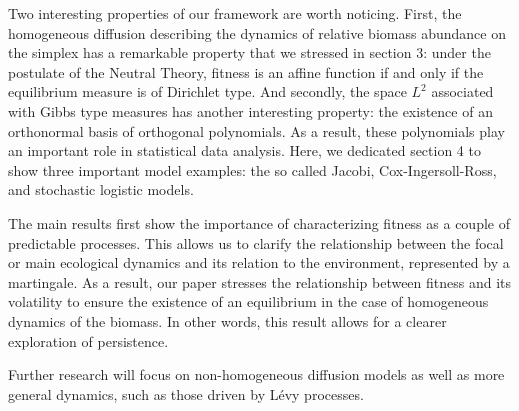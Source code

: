 \documentclass[12pt]{article}
\begin{document}
Two interesting properties of our framework are worth noticing. First, the homogeneous diffusion describing the dynamics of relative biomass abundance on the simplex has a remarkable property that we stressed in section 3: under the postulate of the Neutral Theory, fitness is an affine function if and only if the equilibrium measure is of Dirichlet type. And secondly, the space $L^2$ associated with Gibbs type measures has another interesting property: the existence of an orthonormal basis of orthogonal polynomials. As a result, these polynomials play an important role in statistical data analysis. Here, we dedicated section 4 to show three important model examples: the so called Jacobi, Cox-Ingersoll-Ross, and stochastic logistic models.

The main results first show the importance of characterizing fitness as a couple of predictable processes. This allows us to clarify the relationship between the focal or main ecological dynamics and its relation to the environment, represented by a martingale. As a result, our paper stresses the relationship between fitness and its volatility to ensure the existence of an equilibrium in the case of homogeneous dynamics of the biomass. In other words, this result allows for a clearer exploration of persistence. 

Further research will focus on non-homogeneous diffusion models as well as more general dynamics, such as those driven by Lévy processes. 
\end{document}
